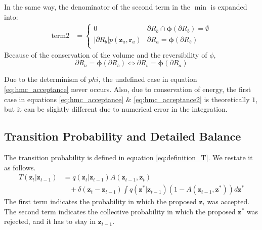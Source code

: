 \documentclass[a4]{article}
\begin{document}
In the same way, the denominator of the second term in the $\min$ is expanded into:
\begin{equation}
\begin{aligned}
\text{term2} &=
    \begin{cases}
        0 & {\partial}R_b \cap \bm{\phi}({\partial}R_b) = \emptyset\\
        \left|{\partial}R_b\right|p( \bm{z}_a, \bm{r}_a )
        & {\partial}R_a = \bm{\phi}({\partial}R_b)\\
    \end{cases}
\end{aligned}
\end{equation}
Because of the conservation of the volume and the reversibility of $\phi$, 
$$ {\partial}R_a = \bm{\phi}({\partial}R_b) \Leftrightarrow
 {\partial}R_b = \bm{\phi}({\partial}R_a)$$

Due to the determinism of $phi$, the undefined case in equation 
\ref{eq:hmc_acceptance} never occurs.
Also, due to conservation of energy, the first case in equations
\ref{eq:hmc_acceptance} \& \ref{eq:hmc_acceptance2} is theoretically $1$,
but it can be slightly different due to numerical error in the integration.


\subsection{Transition Probability and Detailed Balance}
The transition probability is defined in equation \ref{eq:definition_T}.
We restate it as follows.
\begin{equation}
\begin{aligned}
T\left(\bm{z}_{t}|\bm{z}_{t-1}\right)
&= q\left(\bm{z}_{t}|\bm{z}_{t-1}\right)A\left(\bm{z}_{t-1}, \bm{z}_{t}\right)\\
&\:\:\:\:+ \delta\left(\bm{z}_{t} - \bm{z}_{t-1}\right)
\int q\left(\bm{z}^*|\bm{z}_{t-1}\right)\left(1 - A\left(\bm{z}_{t-1}, \bm{z}^*\right)\right)d\bm{z}^*
\end{aligned}
\end{equation}
The first term indicates the probability in which the proposed $\bm{z}_t$
was accepted. The second term indicates 
the collective probability in which the proposed $\bm{z}^*$ was rejected,
and it has to stay in $\bm{z}_{t-1}$.
\end{document}
